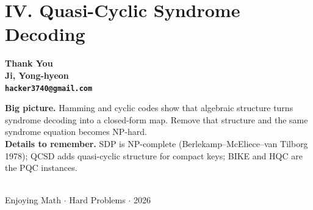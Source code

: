 \documentclass[10pt,aspectratio=1610,compress,dvipsnames]{beamer}
\begin{document}
\section{IV. Quasi-Cyclic Syndrome Decoding}


\begin{frame}[plain]
  \begin{center}\bfseries\centering
    \vspace{1.35cm}
    {\Huge\color{TealDarkCyan} Thank You}\\[.5cm]
    {\large\color{black} Ji, Yong-hyeon}\\[.3cm]
    {\normalsize\texttt{hacker3740@gmail.com}}\\[.5cm]
    \begin{minipage}{.80\textwidth}
      \small\color{Ink}
      \textbf{Big picture.}\;
      Hamming and cyclic codes show that algebraic structure turns syndrome decoding into a closed-form map.
      Remove that structure and the same syndrome equation becomes NP-hard.\\[.2cm]
      \textbf{Details to remember.}\;
      SDP is NP-complete (Berlekamp--McEliece--van Tilborg 1978);
      QCSD adds quasi-cyclic structure for compact keys;
      BIKE and HQC are the PQC instances.
    \end{minipage}\\[.5cm]
    {\small\color{gray} Enjoying Math $\cdot$ Hard Problems $\cdot$ 2026}
    \bigskip
  \end{center}
\end{frame}
\end{document}
